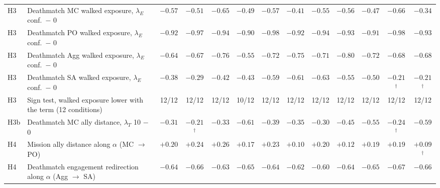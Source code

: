 \begin{tabular}{llccccccccccc}
H3 & Deathmatch MC walked exposure, $\lambda_E$ conf.\ $-$ 0 & $-0.57$ & $-0.51$ & $-0.65$ & $-0.49$ & $-0.57$ & $-0.41$ & $-0.55$ & $-0.56$ & $-0.47$ & $-0.66$ & $-0.34$ \\
H3 & Deathmatch PO walked exposure, $\lambda_E$ conf.\ $-$ 0 & $-0.92$ & $-0.97$ & $-0.94$ & $-0.90$ & $-0.98$ & $-0.92$ & $-0.94$ & $-0.93$ & $-0.91$ & $-0.98$ & $-0.93$ \\
H3 & Deathmatch Agg walked exposure, $\lambda_E$ conf.\ $-$ 0 & $-0.64$ & $-0.67$ & $-0.76$ & $-0.55$ & $-0.72$ & $-0.75$ & $-0.71$ & $-0.80$ & $-0.72$ & $-0.68$ & $-0.68$ \\
H3 & Deathmatch SA walked exposure, $\lambda_E$ conf.\ $-$ 0 & $-0.38$ & $-0.29$ & $-0.42$ & $-0.43$ & $-0.59$ & $-0.61$ & $-0.63$ & $-0.55$ & $-0.50$ & $-0.21$$^{\dagger}$ & $-0.21$$^{\dagger}$ \\
H3 & Sign test, walked exposure lower with the term (12 conditions) & 12/12 & 12/12 & 12/12 & 10/12 & 12/12 & 12/12 & 12/12 & 12/12 & 12/12 & 12/12 & 12/12 \\
H3b & Deathmatch MC ally distance, $\lambda_T$ 10 $-$ 0 & $-0.31$ & $-0.21$$^{\dagger}$ & $-0.33$ & $-0.61$ & $-0.39$ & $-0.35$ & $-0.30$ & $-0.45$ & $-0.55$ & $-0.24$$^{\dagger}$ & $-0.59$ \\
H4 & Mission ally distance along $\alpha$ (MC $\to$ PO) & $+0.20$ & $+0.24$ & $+0.26$ & $+0.17$ & $+0.23$ & $+0.10$ & $+0.20$ & $+0.12$ & $+0.19$ & $+0.19$ & $+0.09$$^{\dagger}$ \\
H4 & Deathmatch engagement redirection along $\alpha$ (Agg $\to$ SA) & $-0.64$ & $-0.66$ & $-0.63$ & $-0.65$ & $-0.64$ & $-0.62$ & $-0.60$ & $-0.64$ & $-0.65$ & $-0.67$ & $-0.66$ \\
\bottomrule
\end{tabular}
